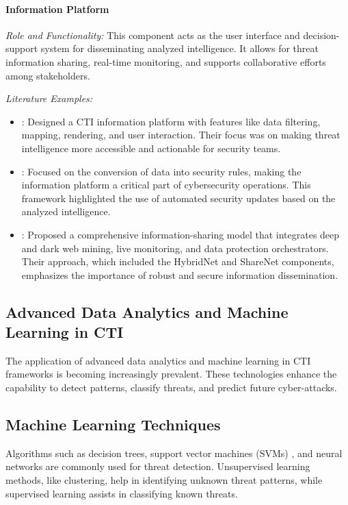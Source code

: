 \documentclass[a4paper,twoside,12pt]{report}
\begin{document}
\paragraph{Information Platform}
\textit{Role and Functionality:} This component acts as the user interface and decision-support system for disseminating analyzed intelligence. It allows for threat information sharing, real-time monitoring, and supports collaborative efforts among stakeholders.

\textit{Literature Examples:}
\begin{itemize}
    \item \citep{bohm2018graph}: Designed a CTI information platform with features like data filtering, mapping, rendering, and user interaction. Their focus was on making threat intelligence more accessible and actionable for security teams.
    \item \citep{kim2016know}: Focused on the conversion of data into security rules, making the information platform a critical part of cybersecurity operations. This framework highlighted the use of automated security updates based on the analyzed intelligence.
    \item \citep{papastergiou2021handling}: Proposed a comprehensive information-sharing model that integrates deep and dark web mining, live monitoring, and data protection orchestrators. Their approach, which included the HybridNet and ShareNet components, emphasizes the importance of robust and secure information dissemination.
\end{itemize}

\subsection{Advanced Data Analytics and Machine Learning in CTI}
The application of advanced data analytics and machine learning in CTI frameworks \citet{naseer2023machine} is becoming increasingly prevalent. These technologies enhance the capability to detect patterns, classify threats, and predict future cyber-attacks.

\subsection*{Machine Learning Techniques}
Algorithms such as decision trees, support vector machines (SVMs) \citet{deliu2017extracting}, and neural networks \citet{yu2023tactics} are commonly used for threat detection. Unsupervised learning methods, like clustering, help in identifying unknown threat patterns, while supervised learning assists in classifying known threats.
\end{document}
